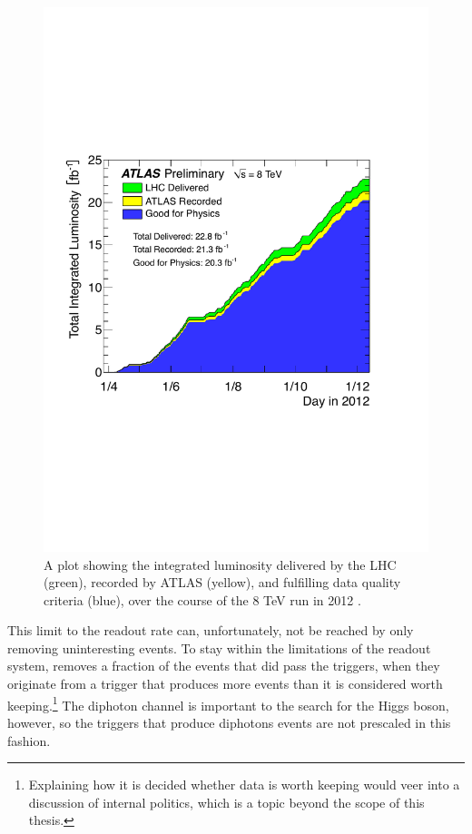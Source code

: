 \begin{figure}[htp]
\begin{minipage}[b]{.69\textwidth}
\hspace{-1em}\includegraphics[width=\textwidth]{figures/intlumi}
\end{minipage}\hfill\begin{minipage}[b]{.3\textwidth}
\caption{A plot showing the integrated luminosity delivered by the LHC (green), recorded by ATLAS (yellow), and fulfilling data quality criteria (blue), over the course of the 8 TeV run in 2012 \cite{publiclumi}.
\label{intlumi}}
\end{minipage}
\end{figure}

This limit to the readout rate can, unfortunately, not be reached by only removing uninteresting events. To stay within the limitations of the readout system, \atlas{} removes a fraction of the events that did pass the triggers, when they originate from a trigger that produces more events than it is considered worth keeping.\footnote{Explaining how it is decided whether data is worth keeping would veer into a discussion of \atlas{} internal politics, which is a topic beyond the scope of this thesis.} The diphoton channel is important to the search for the Higgs boson, however, so the triggers that produce diphotons events are not prescaled in this fashion.

